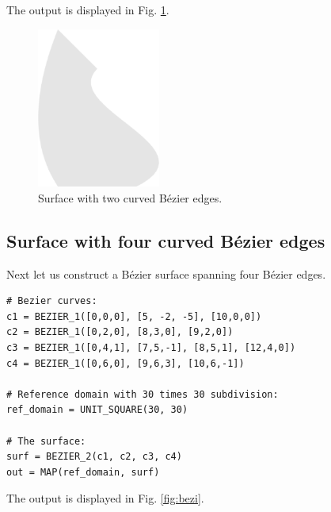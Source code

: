 \noindent
The output is displayed in Fig. \ref{fig:curves-2}.

\begin{figure}[!ht]
\begin{center}
\includegraphics[width=0.36\textwidth]{img/curves-2.png}
\end{center}
\vspace{-4mm}
\caption{Surface with two curved B\'ezier edges.}
\label{fig:curves-2}
\end{figure}

\subsection{Surface with four curved B\'ezier edges}

Next let us construct a B\'ezier surface spanning four 
B\'ezier edges. \\

\begin{bbox}
\begin{verbatim}
# Bezier curves:
c1 = BEZIER_1([0,0,0], [5, -2, -5], [10,0,0])
c2 = BEZIER_1([0,2,0], [8,3,0], [9,2,0])
c3 = BEZIER_1([0,4,1], [7,5,-1], [8,5,1], [12,4,0])
c4 = BEZIER_1([0,6,0], [9,6,3], [10,6,-1])

# Reference domain with 30 times 30 subdivision:
ref_domain = UNIT_SQUARE(30, 30)

# The surface:
surf = BEZIER_2(c1, c2, c3, c4)
out = MAP(ref_domain, surf)
\end{verbatim}
\end{bbox}
\vspace{6mm}

\noindent
The output is displayed in Fig. \ref{fig:bezi}.

